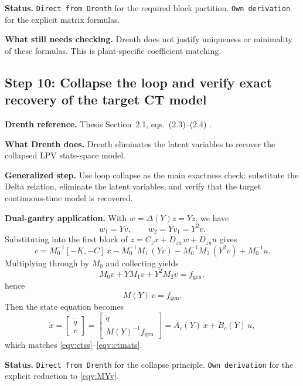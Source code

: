 ﻿\documentclass[11pt]{article}
\newcommand{\audititem}[2]{\par\smallskip\noindent\textbf{#1.} #2\par}
\newcommand{\statusline}[1]{\texttt{#1}}
\begin{document}
\audititem{Status}{\statusline{Direct from Drenth} for the required block
partition. \statusline{Own derivation} for the explicit matrix formulas.}

\audititem{What still needs checking}{Drenth does not justify uniqueness or
minimality of these formulas. This is plant-specific coefficient matching.}

\subsection{Step 10: Collapse the loop and verify exact recovery of the target CT model}

\audititem{Drenth reference}{Thesis Section~2.1, eqs.~(2.3)--(2.4)
\cite{drenth2025thesis}.}

\audititem{What Drenth does}{Drenth eliminates the latent variables to recover
the collapsed LPV state-space model.}

\audititem{Generalized step}{Use loop collapse as the main exactness check:
substitute the Delta relation, eliminate the latent variables, and verify that
the target continuous-time model is recovered.}

\audititem{Dual-gantry application}{With $w = \Delta(Y) z = Y z$, we have
\[
w_1 = Yv, \qquad w_2 = Yv_1 = Y^2 v.
\]
Substituting into the first block of
$z = C_z x + D_{zw} w + D_{zu} u$ gives
\[
v = M_0^{-1}[-K,-C]\,x - M_0^{-1}M_1\,(Yv) - M_0^{-1}M_2\,(Y^2 v) + M_0^{-1}u.
\]
Multiplying through by $M_0$ and collecting yields
\begin{equation}
    M_0 v + Y M_1 v + Y^2 M_2 v = f_{\mathrm{gen}},
    \label{eqv:loopcollapse}
\end{equation}
hence
\begin{equation}
    M(Y)\,v = f_{\mathrm{gen}}.
    \label{eqv:MYv}
\end{equation}
Then the state equation becomes
\[
\dot{x} = \begin{bmatrix} \dot{q} \\ v \end{bmatrix}
= \begin{bmatrix} \dot{q} \\ M(Y)^{-1} f_{\mathrm{gen}} \end{bmatrix}
= A_c(Y)\,x + B_c(Y)\,u,
\]
which matches \eqref{eqv:ctss}--\eqref{eqv:ctmats}.}

\audititem{Status}{\statusline{Direct from Drenth} for the collapse principle.
\statusline{Own derivation} for the explicit reduction to \eqref{eqv:MYv}.}
\end{document}
